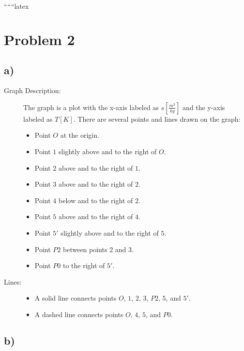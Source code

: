 
``````latex


\section*{Problem 2}

\subsection*{a)}

\begin{description}
    \item[Graph Description:] The graph is a plot with the x-axis labeled as $s\left[\frac{m^3}{kg}\right]$ and the y-axis labeled as $T\left[K\right]$. There are several points and lines drawn on the graph:
    \begin{itemize}
        \item Point $O$ at the origin.
        \item Point $1$ slightly above and to the right of $O$.
        \item Point $2$ above and to the right of $1$.
        \item Point $3$ above and to the right of $2$.
        \item Point $4$ below and to the right of $2$.
        \item Point $5$ above and to the right of $4$.
        \item Point $5'$ slightly above and to the right of $5$.
        \item Point $P2$ between points $2$ and $3$.
        \item Point $P0$ to the right of $5'$.
    \end{itemize}
    \item[Lines:] 
    \begin{itemize}
        \item A solid line connects points $O$, $1$, $2$, $3$, $P2$, $5$, and $5'$.
        \item A dashed line connects points $O$, $4$, $5$, and $P0$.
    \end{itemize}
\end{description}

\subsection*{b)}

